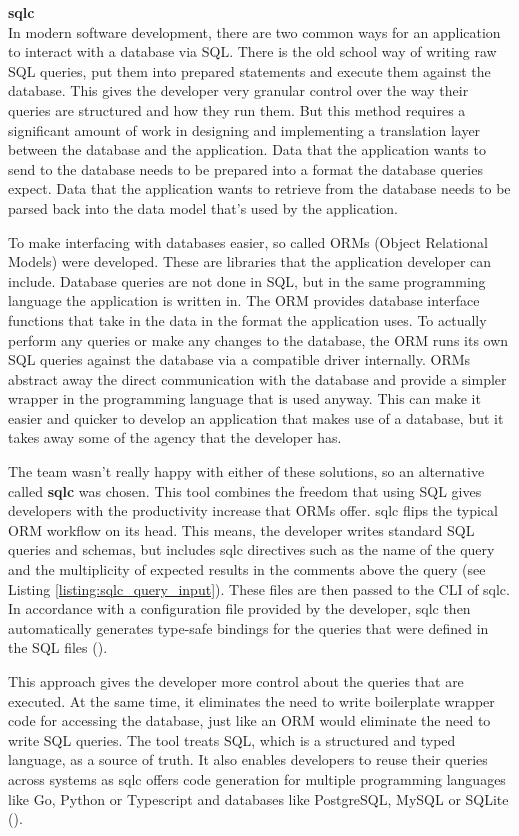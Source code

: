 \textbf{sqlc}\\
In modern software development, there are two common ways for an application to
interact with a database via SQL. There is the old school way of writing raw SQL
queries, put them into prepared statements and execute them against the
database. This gives the developer very granular control over the way their
queries are structured and how they run them. But this method requires a
significant amount of work in designing and implementing a translation layer
between the database and the application. Data that the application wants to
send to the database needs to be prepared into a format the database queries
expect. Data that the application wants to retrieve from the database needs to
be parsed back into the data model that's used by the application.

To make interfacing with databases easier, so called ORMs (Object Relational
Models) were developed. These are libraries that the application developer can
include. Database queries are not done in SQL, but in the same programming
language the application is written in. The ORM provides database interface
functions that take in the data in the format the application uses. To actually
perform any queries or make any changes to the database, the ORM runs its own
SQL queries against the database via a compatible driver internally. ORMs
abstract away the direct communication with the database and provide a simpler
wrapper in the programming language that is used anyway. This can make it easier
and quicker to develop an application that makes use of a database, but it takes
away some of the agency that the developer has.

The team wasn't really happy with either of these solutions, so an alternative
called \textbf{sqlc} was chosen. This tool combines the freedom that using SQL gives
developers with the productivity increase that ORMs offer. sqlc flips the
typical ORM workflow on its head. This means, the developer writes standard SQL
queries and schemas, but includes sqlc directives such as the name of the query
and the multiplicity of expected results in the comments above the query (see
Listing \ref{listing:sqlc_query_input}). These files are then passed to the CLI
of sqlc. In accordance with a configuration file provided by the developer, sqlc
then automatically generates type-safe bindings for the queries that were
defined in the SQL files (\cite{sqlc_introduction}).

This approach gives the developer more control about the queries that are
executed. At the same time, it eliminates the need to write boilerplate wrapper
code for accessing the database, just like an ORM would eliminate the need to
write SQL queries. The tool treats SQL, which is a structured and typed
language, as a source of truth. It also enables developers to reuse their
queries across systems as sqlc offers code generation for multiple programming
languages like Go, Python or Typescript and databases like PostgreSQL, MySQL or
SQLite (\cite{sqlc_documentation_language_support}).

